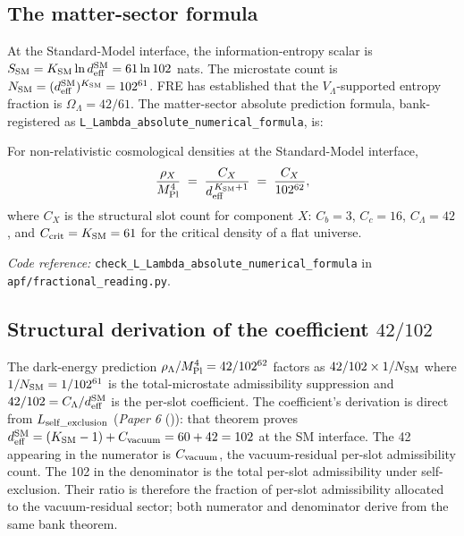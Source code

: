\documentclass[11pt]{article}
\newcommand{\coderef}[2]{\smallskip\noindent\textit{Code reference:} \texttt{#1} in \texttt{#2}.}
\newcommand{\paperref}[2]{\emph{Paper #1} (\emph{#2})}
\newcommand{\Mpl}{M_{\rm Pl}}
\begin{document}
\subsection{The matter-sector formula}\label{sec:cosmology_formula}

At the Standard-Model interface, the information-entropy scalar is $S_{\rm SM} = K_{\rm SM} \ln d_{\rm eff}^{\rm SM} = 61 \ln 102$ nats. The microstate count is $N_{\rm SM} = (d_{\rm eff}^{\rm SM})^{K_{\rm SM}} = 102^{61}$. FRE has established that the $V_\Lambda$-supported entropy fraction is $\Omega_\Lambda = 42/61$. The matter-sector absolute prediction formula, bank-registered as \texttt{L\_Lambda\_absolute\_numerical\_formula}, is:

\begin{tcolorbox}[apfbox, title={Matter-sector absolute formula}]
For non-relativistic cosmological densities at the Standard-Model interface,
\[
\frac{\rho_X}{\Mpl^4} \;=\; \frac{C_X}{d_{\rm eff}^{\,K_{\rm SM}+1}} \;=\; \frac{C_X}{102^{62}},
\]
where $C_X$ is the structural slot count for component $X$: $C_b = 3$, $C_c = 16$, $C_\Lambda = 42$, and $C_{\rm crit} = K_{\rm SM} = 61$ for the critical density of a flat universe.
\end{tcolorbox}

\coderef{check\_L\_Lambda\_absolute\_numerical\_formula}{apf/fractional\_reading.py}

\subsection{Structural derivation of the coefficient $42/102$}\label{sec:cosmology_coefficient}

The dark-energy prediction $\rho_\Lambda/\Mpl^4 = 42/102^{62}$ factors as $42/102 \times 1/N_{\rm SM}$ where $1/N_{\rm SM} = 1/102^{61}$ is the total-microstate admissibility suppression and $42/102 = C_\Lambda/d_{\rm eff}^{\rm SM}$ is the per-slot coefficient. The coefficient's derivation is direct from $L_{\rm self\_exclusion}$ (\paperref{6}{}): that theorem proves $d_{\rm eff}^{\rm SM} = (K_{\rm SM} - 1) + C_{\rm vacuum} = 60 + 42 = 102$ at the SM interface. The 42 appearing in the numerator is $C_{\rm vacuum}$, the vacuum-residual per-slot admissibility count. The 102 in the denominator is the total per-slot admissibility under self-exclusion. Their ratio is therefore the fraction of per-slot admissibility allocated to the vacuum-residual sector; both numerator and denominator derive from the same bank theorem.
\end{document}
